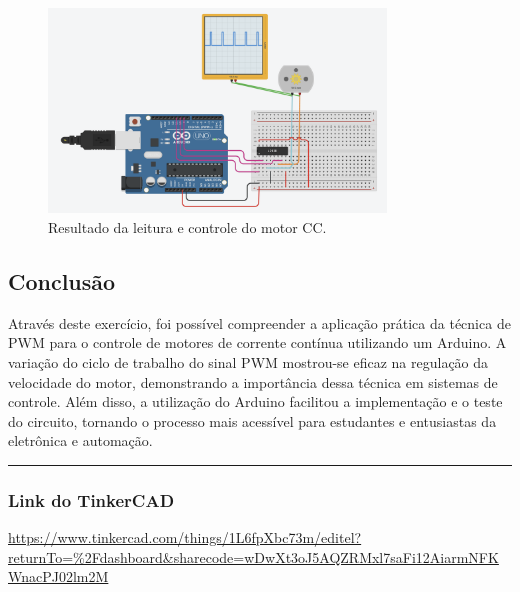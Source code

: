 \documentclass[12pt, a4paper]{article}
\begin{document}
\begin{figure}[H]
	\centering
	\includegraphics[width=0.8\textwidth]{./images/montagem_tinkercad_aula05.png}
	\caption{Resultado da leitura e controle do motor CC.}
	\label{fig:resultado_leitura}
\end{figure}

\newpage
\begin{center}
	\section{Conclusão}
\end{center}
Através deste exercício, foi possível compreender a aplicação prática da técnica de PWM para o controle de motores de corrente contínua utilizando um Arduino. A variação do ciclo de trabalho do sinal PWM mostrou-se eficaz na regulação da velocidade do motor, demonstrando a importância dessa técnica em sistemas de controle. Além disso, a utilização do Arduino facilitou a implementação e o teste do circuito, tornando o processo mais acessível para estudantes e entusiastas da eletrônica e automação.

\rule{\textwidth}{0.4pt}
\subsubsection{Link do TinkerCAD}
\url{https://www.tinkercad.com/things/1L6fpXbc73m/editel?returnTo=%2Fdashboard&sharecode=wDwXt3oJ5AQZRMxl7saFi12AiarmNFKWnacPJ02lm2M}
\end{document}
